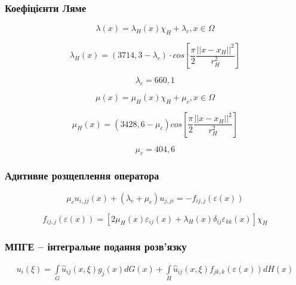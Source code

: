 \documentclass{beamer}
\begin{document}
\begin{frame}
    \frametitle{Коефіцієнти Ляме}
    \begin{equation}
        \label{eqn:elasticity_lyame_lambda}
        \lambda(x) = \lambda_H(x)\chi_H + \lambda_c, x \in \Omega
    \end{equation}

    \begin{equation*}
        \lambda_H(x) = (3714,3 - \lambda_c) \cdot cos\left[\frac{\pi}{2}\frac{||x-x_H||^2}{r_H^2}\right]
    \end{equation*}

    \begin{equation*}
        \lambda_c = 660,1
    \end{equation*}

    \begin{equation}
        \label{eqn:elasticity_lyame_mu}
        \mu(x) = \mu_H(x)\chi_H + \mu_c, x \in \Omega
    \end{equation}

    \begin{equation*}
        \mu_H(x) = (3428,6 - \mu_c)cos\left[\frac{\pi}{2}\frac{||x-x_H||^2}{r_H^2}\right]
    \end{equation*}

    \begin{equation*}
        \mu_c = 404,6
    \end{equation*}
\end{frame}

\begin{frame}
    \frametitle{Адитивне розщеплення оператора}
    \begin{equation}
        \label{eqn:elasticity_displacement_separation_eqn}
        \mu_c u_{i,jj}(x) + (\lambda_c + \mu_c)u_{j,ji} = -f_{ij,j}(\varepsilon(x))
    \end{equation}

    \begin{equation*}
        f_{ij,j}(\varepsilon(x)) = [ 2\mu_H(x)\varepsilon_{ij}(x) + \lambda_H(x) \delta_{ij} \varepsilon_{kk}(x) ]
        \chi_H
    \end{equation*}
\end{frame}

\begin{frame}
    \frametitle{МПГЕ -- інтегральне подання розв'язку}
    \begin{equation*}
        \begin{split}
            u_i(\xi) = \int \limits_G \hat{u}_{ij}(x,\xi) g_j(x)d G(x)
            + \int \limits_H \hat{u}_{ij}(x,\xi)f_{jk,k}(\varepsilon(x))d H(x)
        \end{split}
    \end{equation*}
\end{frame}
\end{document}
